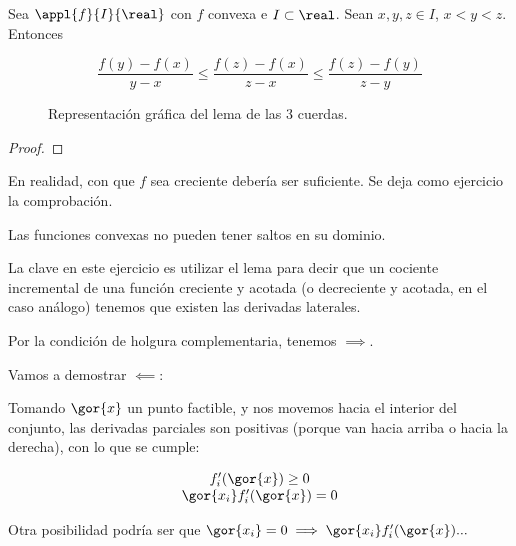 \begin{problem}[4]


\solution

\begin{lemma}
Sea $\appl{f}{I}{\real}$ con $f$ convexa e $I\subset \real$.
%
Sean $x,y,z \in I$, $x<y<z$.
%
Entonces

\[
\frac{f(y)-f(x)}{y-x} \leq \frac{f(z)-f(x)}{z-x} \leq \frac{f(z)-f(y)}{z-y}
\]
\end{lemma}


\begin{figure}[hbtp]
\centering
{}
\caption{Representación gráfica del lema de las 3 cuerdas.}
\end{figure}

\begin{proof}

\end{proof}

\obs En realidad, con que $f$ sea creciente debería ser suficiente.
%
Se deja como ejercicio la comprobación.

\ppart Las funciones convexas no pueden tener saltos en su dominio.

La clave en este ejercicio es utilizar el lema para decir que un cociente incremental de una función creciente y acotada (o decreciente y acotada, en el caso análogo) tenemos que existen las derivadas laterales.

\end{problem}

\begin{problem}[8]


\solution

Por la condición de holgura complementaria, tenemos $\implies$.

Vamos a demostrar $\impliedby$:


Tomando $\gor{x}$ un punto factible, y nos movemos hacia el interior del conjunto, las derivadas parciales son positivas (porque van hacia arriba o hacia la derecha), con lo que se cumple:

\[
    \begin{array}{c}
        f'_i(\gor{x}) \geq 0\\
        \gor{x_i}f'_i(\gor{x}) = 0
    \end{array}
\]

Otra posibilidad podría ser que $\gor{x_i} = 0 \implies \gor{x_i}f_i'(\gor{x}) ...$
\end{problem}


